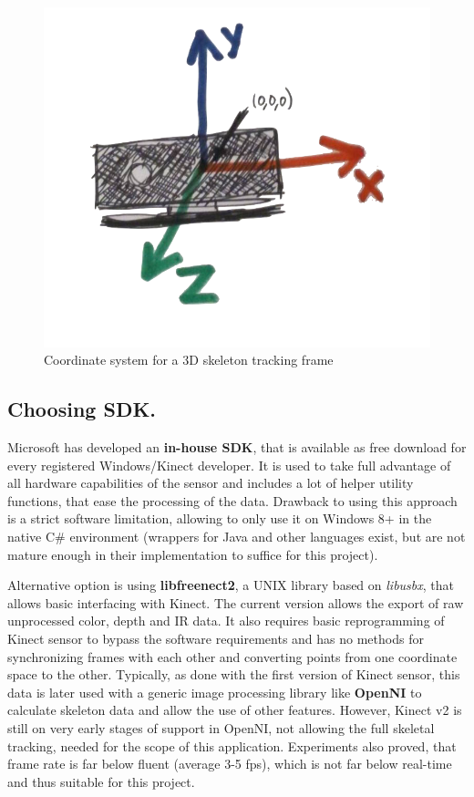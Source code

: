 \documentclass[a4paper,11pt,oneside]{article}
\begin{document}
\begin{figure}[H]
\centering
\includegraphics[scale=0.3]{coordinate-3d.png}
\caption{Coordinate system for a 3D skeleton tracking frame}
\end{figure}

\subsection{Choosing SDK.}

Microsoft has developed an \textbf{in-house SDK}, that is available as free download for every registered Windows/Kinect developer. It is used to take full advantage of all hardware capabilities of the sensor and includes a lot of helper utility functions, that ease the processing of the data. Drawback to using this approach is a strict software limitation, allowing to only use it on Windows 8+ in the native C\# environment (wrappers for Java and other languages exist, but are not mature enough in their implementation to suffice for this project).

Alternative option is using \textbf{libfreenect2}, a UNIX library based on \textit{libusbx}, that allows basic interfacing with Kinect. The current version allows the export of raw unprocessed color, depth and IR data. It also requires basic reprogramming of Kinect sensor to bypass the software requirements and has no methods for synchronizing frames with each other and converting points from one coordinate space to the other. Typically, as done with the first version of Kinect sensor, this data is later used with a generic image processing library like \textbf{OpenNI} to calculate skeleton data and allow the use of other features. However, Kinect v2 is still on very early stages of support in OpenNI, not allowing the full skeletal tracking, needed for the scope of this application. Experiments also proved, that frame rate is far below fluent (average 3-5 fps), which is not far below real-time and thus suitable for this project.
\end{document}
